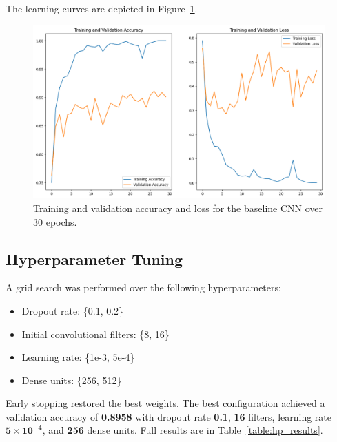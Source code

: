 \documentclass[conference]{IEEEtran}
\begin{document}
The learning curves are depicted in Figure~\ref{fig:baseline_curves}.

\begin{figure}[htbp]
	\centerline{\includegraphics[width=\linewidth]{Images/baseline_curves.png}}
	\caption{Training and validation accuracy and loss for the baseline CNN over 30 epochs.}
	\label{fig:baseline_curves}
\end{figure}

\subsection{Hyperparameter Tuning}
A grid search was performed over the following hyperparameters:
\begin{itemize}
	\item Dropout rate: \{0.1, 0.2\}
	\item Initial convolutional filters: \{8, 16\}
	\item Learning rate: \{1e-3, 5e-4\}
	\item Dense units: \{256, 512\}
\end{itemize}

Early stopping restored the best weights. The best configuration achieved a validation accuracy of \textbf{0.8958} with dropout rate \textbf{0.1}, \textbf{16} filters, learning rate \(\mathbf{5\times10^{-4}}\), and \textbf{256} dense units. Full results are in Table~\ref{table:hp_results}.
\end{document}
